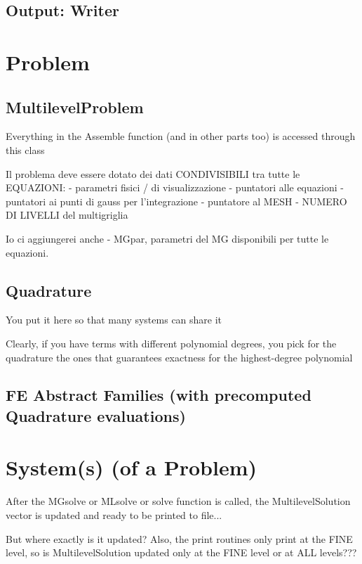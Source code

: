 \documentclass[10pt]{book}
\begin{document}
  
  \section{Output: Writer}

  
  \chapter{Problem}

  
    \section{MultilevelProblem}

  Everything in the Assemble function (and in other parts too) is accessed through this class
  
Il problema deve essere dotato dei dati CONDIVISIBILI tra tutte le EQUAZIONI:
   - parametri fisici / di visualizzazione
   - puntatori alle equazioni
   - puntatori ai punti di gauss per l'integrazione
   - puntatore al MESH
   - NUMERO DI LIVELLI del multigriglia

Io ci aggiungerei anche 
   - MGpar, parametri del MG disponibili per tutte le equazioni.
   
\section{ Quadrature }

You put it here so that many systems can share it

Clearly, if you have terms with different polynomial degrees,
you pick for the quadrature the ones that guarantees exactness for the highest-degree polynomial
  
\section{FE Abstract Families (with precomputed Quadrature evaluations)}
  
  
  
  \chapter{System(s) (of a Problem)}


  
     After the MGsolve or MLsolve or solve function is called,
   the MultilevelSolution vector is updated and ready to be printed to file...
   
   But where exactly is it updated?
   Also, the print routines only print at the FINE level,
   so is MultilevelSolution updated only at the FINE level or at ALL levels???
   
\end{document}
